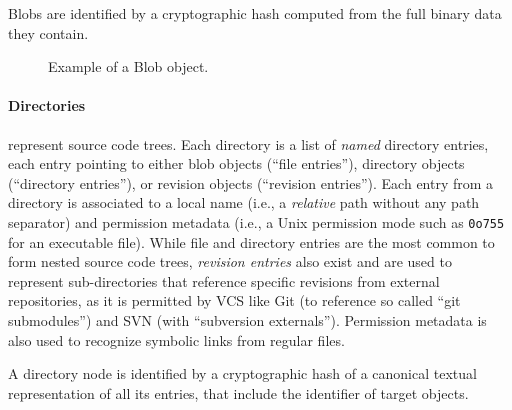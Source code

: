 Blobs are identified by a cryptographic hash computed from the full binary data
they contain.

\begin{figure}%
    \centering
    \caption{Example of a Blob object.}
\end{figure}



\begin{figure}\centering
{}
\end{figure}
\paragraph{\textbf{Directories}} represent source code trees. Each directory is
a list of \emph{named} directory entries, each entry pointing to either blob
objects (``file entries''), directory objects (``directory entries''), or
revision objects (``revision entries''). Each entry from a directory is
associated to a local name (i.e., a \emph{relative} path without any path
separator) and permission metadata (i.e., a Unix permission mode such as
\texttt{0o755} for an executable file). While file and directory entries are
the most common to form nested source code trees, \emph{revision entries} also
exist and are used to represent sub-directories that reference specific
revisions from external repositories, as it is permitted by VCS like Git (to
reference so called ``git submodules'') and SVN (with ``subversion
externals''). Permission metadata is also used to recognize symbolic links from
regular files.

A directory node is identified by a cryptographic hash of a canonical textual
representation of all its entries, that include the identifier of target
objects.

